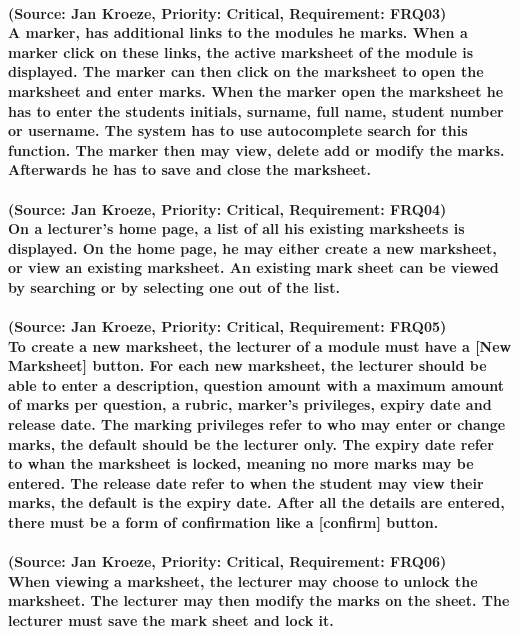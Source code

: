 \documentclass[12pt]{article}
\begin{document}
  \paragraph{ (Source: Jan Kroeze, Priority: Critical, Requirement: FRQ03) \\
  A marker, has additional links to the modules he marks. When a marker click on these links, the active marksheet of the module is displayed. The marker can then click on the marksheet to open the marksheet and enter marks. When the marker open the marksheet he has to enter the students initials, surname, full name, student number or username. The system has to use autocomplete search for this function. The marker then may view, delete add or modify the marks. Afterwards he has to save and close the marksheet.}
  \paragraph{ (Source: Jan Kroeze, Priority: Critical, Requirement: FRQ04) \\
  On a lecturer's home page, a list of all his existing marksheets is displayed. On the home page, he may either create a new marksheet, or view an existing marksheet. An existing mark sheet can be viewed by searching or by selecting one out of the list.}
  \paragraph{ (Source: Jan Kroeze, Priority: Critical, Requirement: FRQ05) \\
  To create a new marksheet, the lecturer of a module must have a [New Marksheet] button. For each new marksheet, the lecturer should be able to enter a description, question amount with a maximum amount of marks per question, a rubric, marker's privileges, expiry date and release date. The marking privileges refer to who may enter or change marks, the default should be the lecturer only. The expiry date refer to whan the marksheet is locked, meaning no more marks may be entered. The release date refer to when the student may view their marks, the default is the expiry date. After all the details are entered, there must be a form of confirmation like a [confirm] button.}
  \paragraph{ (Source: Jan Kroeze, Priority: Critical, Requirement: FRQ06) \\
  When viewing a marksheet, the lecturer may choose to unlock the marksheet. The lecturer may then modify the marks on the sheet. The lecturer must save the mark sheet and lock it. }
\end{document}
